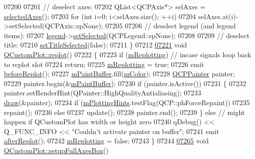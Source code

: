 \begin{DoxyCode}
07200   
07201   \textcolor{comment}{// deselect axes:}
07202   QList<QCPAxis*> selAxes = \hyperlink{a00116_aa6baf867e8beb96ed5bd471f83ece903}{selectedAxes}();
07203   \textcolor{keywordflow}{for} (\textcolor{keywordtype}{int} i=0; i<selAxes.size(); ++i)
07204     selAxes.at(i)->setSelected(QCPAxis::spNone);
07205   
07206   \textcolor{comment}{// deselect legend (and legend items):}
07207   \hyperlink{a00116_a75acd427ec48e9a9d2ae6a17817cc490}{legend}->\hyperlink{a00045_a752c48b30f8ba870b55e79659385f107}{setSelected}(QCPLegend::spNone);
07208   
07209   \textcolor{comment}{// deselect title:}
07210   \hyperlink{a00116_aa89e06c04804ff2a0994ccb1aa80d131}{setTitleSelected}(\textcolor{keyword}{false});
07211 \}
07212 
\hypertarget{a00115_source_l07221}{}\hyperlink{a00116_a563540b54b2a09c8ef092d42e9621f42}{07221} \textcolor{keywordtype}{void} \hyperlink{a00116_a563540b54b2a09c8ef092d42e9621f42}{QCustomPlot::replot}()
07222 \{
07223   \textcolor{keywordflow}{if} (\hyperlink{a00116_a38ce5778fc22072b64b7ccc05963c684}{mReplotting}) \textcolor{comment}{// incase signals loop back to replot slot}
07224     \textcolor{keywordflow}{return};
07225   \hyperlink{a00116_a38ce5778fc22072b64b7ccc05963c684}{mReplotting} = \textcolor{keyword}{true};
07226   emit \hyperlink{a00116_a0cd30e29b73efd6afe096e44bc5956f5}{beforeReplot}();
07227   \hyperlink{a00116_a804ea55d1894964076fe02acf11da591}{mPaintBuffer}.fill(\hyperlink{a00116_ac071280171e215ffc7d416118bc28d90}{mColor});
07228   \hyperlink{a00047}{QCPPainter} painter;
07229   painter.begin(&\hyperlink{a00116_a804ea55d1894964076fe02acf11da591}{mPaintBuffer});
07230   \textcolor{keywordflow}{if} (painter.isActive()) 
07231   \{
07232     painter.setRenderHint(QPainter::HighQualityAntialiasing);
07233     \hyperlink{a00116_a2e9b3d14dffa43c79835869d488936c9}{draw}(&painter);
07234     \textcolor{keywordflow}{if} (\hyperlink{a00116_af6de5d56e261af21cf6223179fc58883}{mPlottingHints}.testFlag(QCP::phForceRepaint))
07235       repaint();
07236     \textcolor{keywordflow}{else}
07237       update();
07238     painter.end();
07239   \} \textcolor{keywordflow}{else} \textcolor{comment}{// might happen if QCustomPlot has width or height zero}
07240     qDebug() << Q\_FUNC\_INFO << \textcolor{stringliteral}{"Couldn't activate painter on buffer"};
07241   emit \hyperlink{a00116_a6f4fa624af060bc5919c5f266cf426a0}{afterReplot}();
07242   \hyperlink{a00116_a38ce5778fc22072b64b7ccc05963c684}{mReplotting} = \textcolor{keyword}{false};
07243 \}
07244 
\hypertarget{a00115_source_l07265}{}\hyperlink{a00116_ad27d34bcc9e68b5482d128e2f1e38f55}{07265} \textcolor{keywordtype}{void} \hyperlink{a00116_ad27d34bcc9e68b5482d128e2f1e38f55}{QCustomPlot::setupFullAxesBox}()

\end{DoxyCode}
